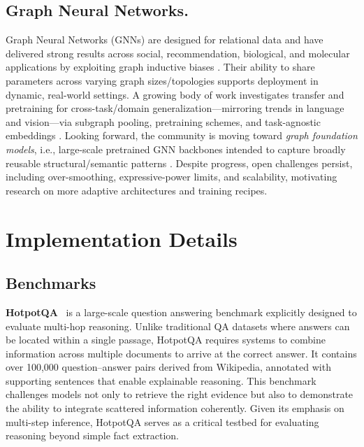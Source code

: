 \documentclass[11pt]{article}
\begin{document}
\subsection{Graph Neural Networks.}
Graph Neural Networks (GNNs) are designed for relational data and have delivered strong results across social, recommendation, biological, and molecular applications by exploiting graph inductive biases \cite{kipf2016semi, velivckovic2017graph, hamilton2017inductive}. Their ability to share parameters across varying graph sizes/topologies supports deployment in dynamic, real-world settings. A growing body of work investigates transfer and pretraining for cross-task/domain generalization—mirroring trends in language and vision—via subgraph pooling, pretraining schemes, and task-agnostic embeddings \cite{ma2023hypergraph, wang2024subgraph, ma2025llm, cao2023pre, ma2025adaptive}. Looking forward, the community is moving toward \emph{graph foundation models}, i.e., large-scale pretrained GNN backbones intended to capture broadly reusable structural/semantic patterns \cite{wang2024gft, qian2024dual, wang2025neural, wang2024learning}. Despite progress, open challenges persist, including over-smoothing, expressive-power limits, and scalability, motivating research on more adaptive architectures and training recipes.


\section{Implementation Details}
\subsection{Benchmarks}
\label{appendix:Benchmarks}

\textbf{HotpotQA}~\citep{yang2018hotpotqa} is a large-scale question answering benchmark explicitly designed to evaluate multi-hop reasoning. Unlike traditional QA datasets where answers can be located within a single passage, HotpotQA requires systems to combine information across multiple documents to arrive at the correct answer. It contains over 100,000 question–answer pairs derived from Wikipedia, annotated with supporting sentences that enable explainable reasoning. This benchmark challenges models not only to retrieve the right evidence but also to demonstrate the ability to integrate scattered information coherently. Given its emphasis on multi-step inference, HotpotQA serves as a critical testbed for evaluating reasoning beyond simple fact extraction. 
\end{document}
